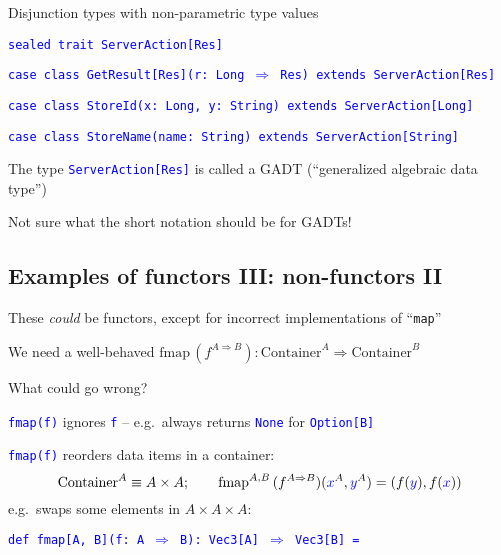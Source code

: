 Disjunction types with non-parametric type values

\texttt{\textcolor{blue}{\footnotesize{}sealed trait ServerAction{[}Res{]}}}{\footnotesize\par}

\texttt{\textcolor{blue}{\footnotesize{}case class GetResult{[}Res{]}(r: Long
$\Rightarrow$ Res) extends ServerAction{[}Res{]}}}{\footnotesize\par}

\texttt{\textcolor{blue}{\footnotesize{}case class StoreId(x: Long,
y: String) extends ServerAction{[}Long{]}}}{\footnotesize\par}

\texttt{\textcolor{blue}{\footnotesize{}case class StoreName(name: String)
extends ServerAction{[}String{]}}}{\footnotesize\par}

The type \texttt{\textcolor{blue}{\footnotesize{}ServerAction{[}Res{]}}}
is called a GADT (``generalized algebraic data type'')

Not sure what the short notation should be for GADTs!


\subsection{Examples of functors III: non-functors II}

These \emph{could} be functors, except for incorrect implementations
of ``\texttt{map}''

We need a well-behaved $\text{fmap}\,(f^{A\Rightarrow B}):\text{Container}^{A}\Rightarrow\text{Container}^{B}$

What could go wrong?

\texttt{\textcolor{blue}{\footnotesize{}fmap(f)}} ignores \texttt{\textcolor{blue}{\footnotesize{}f}}
– e.g.\ always returns \texttt{\textcolor{blue}{\footnotesize{}None}}
for \texttt{\textcolor{blue}{\footnotesize{}Option{[}B{]}}}{\footnotesize\par}

\texttt{\textcolor{blue}{\footnotesize{}fmap(f)}} reorders data items
in a container: 
\[
\text{Container}^{A}\equiv A\times A;\qquad\text{fmap}^{A,B}\,(f^{A\Rightarrow B})({\color{blue}x}^{A},{\color{blue}y}^{A})=\left(f({\color{blue}y}),f({\color{blue}x})\right)
\]
e.g.\ swaps some elements in $A\times A\times A$:

\texttt{\textcolor{blue}{\footnotesize{}def fmap{[}A, B{]}(f: A $\Rightarrow$
B): Vec3{[}A{]} $\Rightarrow$ Vec3{[}B{]} =}}{\footnotesize\par}

